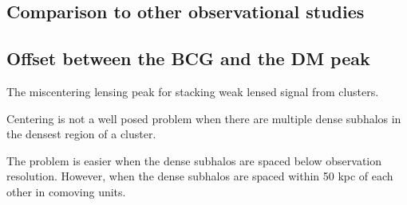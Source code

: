 \subsection{Comparison to other observational studies}
\subsection{Offset between the BCG and the DM peak}
The 
\cite{Zitrin2012}
\cite{Zitrin2012a}
miscentering lensing peak for stacking weak lensed signal from clusters.  

Centering is not a well posed problem when there are multiple dense subhalos in the densest
region of a cluster.

The problem is easier when the dense subhalos are spaced below observation resolution. 
However, when the dense subhalos are spaced within 50 kpc of each other in
comoving units.  


% 
% 
% 
% 
% 
% 
% 
% 
% 
% 
% 
% 
% 
% 
% 
% 
% 
% 
